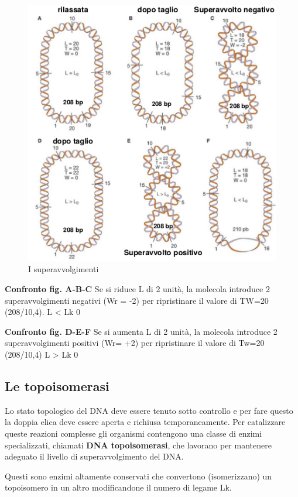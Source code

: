\documentclass[11pt]{book}
\begin{document}
\clearpage
\begin{figure}[htp]
\centering
\includegraphics[scale=0.55]{img/02_Superavvolgimenti.png}
\caption{I superavvolgimenti}
\label{superavvolgimenti}
\end{figure}

\textbf{Confronto fig. A-B-C} Se si riduce L di 2 unità, la molecola
introduce 2 superavvolgimenti negativi (Wr = -2) per ripristinare il
valore di TW=20 (208/10,4). L \textless{} Lk 0

\textbf{Confronto fig. D-E-F} Se si aumenta L di 2 unità, la molecola
introduce 2 superavvolgimenti positivi (Wr= +2) per ripristinare il
valore di Tw=20 (208/10,4) L \textgreater{} Lk 0

\subsection{Le topoisomerasi}\label{le-topoisomerasi}

Lo stato topologico del DNA deve essere tenuto sotto controllo e per
fare questo la doppia elica deve essere aperta e richiusa
temporaneamente. Per catalizzare queste reazioni complesse gli organismi
contengono una classe di enzimi specializzati, chiamati \textbf{DNA
topoisomerasi}, che lavorano per mantenere adeguato il livello di
superavvolgimento del DNA.

Questi sono enzimi altamente conservati che convertono (isomerizzano) un
topoisomero in un altro modificandone il numero di legame Lk.
\end{document}
